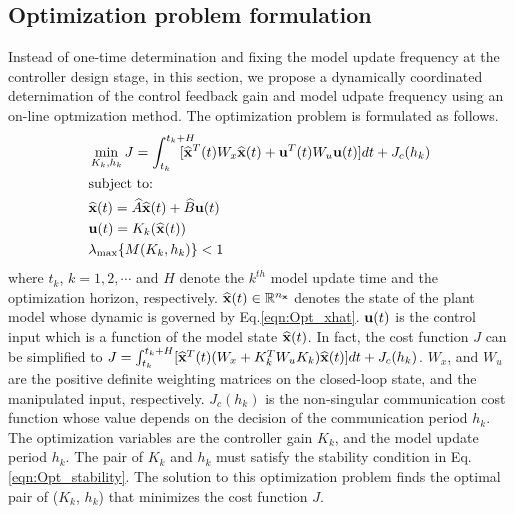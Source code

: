 \documentclass[letterpaper, 10 pt, conference]{ieeeconf}\IEEEoverridecommandlockouts%
\begin{document}
\subsection{Optimization problem formulation}
Instead of one-time determination and fixing the model update frequency at the controller design stage, in this section, we propose a dynamically coordinated deternimation of the control feedback gain and model udpate frequency using an on-line optmization method. The optimization problem is formulated as follows.
\begin{subequations}\label{eqn:Optimization}
  \begin{align}
    &\min_{K_k, h_k} J = \int_{t_k}^{t_k+H} \hspace{-4mm} [\bxh^T(t)W_x\bxh(t) + \bu^T(t)W_u\bu(t)]dt + J_c(h_k)\\
    &\text{subject to:}\nonumber\\
    &\bxh(t) = \widehat{A}\bxh(t) + \widehat{B}\bu(t)\\ \label{eqn:Opt_xhat}
    &\bu(t) = K_k(\bxh(t))\\
    &\lambda_{\max}\{M(K_k, h_k)\} < 1 \label{eqn:Opt_stability}
  \end{align}
\end{subequations}
where $t_k$, $k = 1,2,\cdots$ and $H$ denote the $k^{th}$ model update time and the optimization horizon, respectively. $\widehat{\mathbf{x}}(t)\in\mathbb{R}^{n_{\mathbf{x}}}$ denotes the state of the plant model whose dynamic is governed by Eq.\ref{eqn:Opt_xhat}. $\mathbf{u}(t)$ is the control input which is a function of the model state $\widehat{\mathbf{x}}(t)$. In fact, the cost function $J$ can be simplified to $J = \int_{t_k}^{t_k+H}[\widehat{\mathbf{x}}^T(t)(W_x + K_k^TW_uK_k)\widehat{\mathbf{x}}(t)]dt + J_c(h_k)$. $W_x$, and $W_u$ are the positive definite weighting matrices on the closed-loop state, and the manipulated input, respectively. $J_c(h_k)$ is the non-singular communication cost function whose value depends on the decision of the communication period $h_k$. The optimization variables are the controller gain $K_k$, and the model update period $h_k$. The pair of $K_k$ and $h_k$ must satisfy the stability condition in Eq.\ref{eqn:Opt_stability}. The solution to this optimization problem finds the optimal pair of ($K_k$, $h_k$) that minimizes the cost function $J$.
\end{document}
